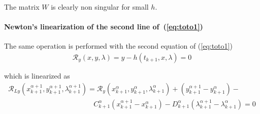 The matrix $W$ is clearly non singular for small $h$.







 \paragraph{Newton's linearization of the second  line of~(\ref{eq:toto1})}
The same operation is performed with the second equation of (\ref{eq:toto1})
\begin{equation}
  \begin{array}{l}
    \mathcal R_y(x,y,\lambda)=y-h(t_{k+1},x,\lambda) =0\\ \\
  \end{array}
\end{equation}
which is linearized as
\begin{equation}
  \label{eq:NL9}
  \begin{array}{l}
    \mathcal R_{Ly}(x^{\alpha+1}_{k+1},y^{\alpha+1}_{k+1},\lambda^{\alpha+1}_{k+1}) = \mathcal
    R_{y}(x^{\alpha}_{k+1},y^{\alpha}_{k+1},\lambda^{\alpha}_{k+1}) +
    (y^{\alpha+1}_{k+1}-y^{\alpha}_{k+1})- \\[2mm] \qquad  \qquad \qquad \qquad  \qquad \qquad
    C^{\alpha}_{k+1}(x^{\alpha+1}_{k+1}-x^{\alpha}_{k+1}) - D^{\alpha}_{k+1}(\lambda^{\alpha+1}_{k+1}-\lambda^{\alpha}_{k+1})=0
  \end{array}
\end{equation}

